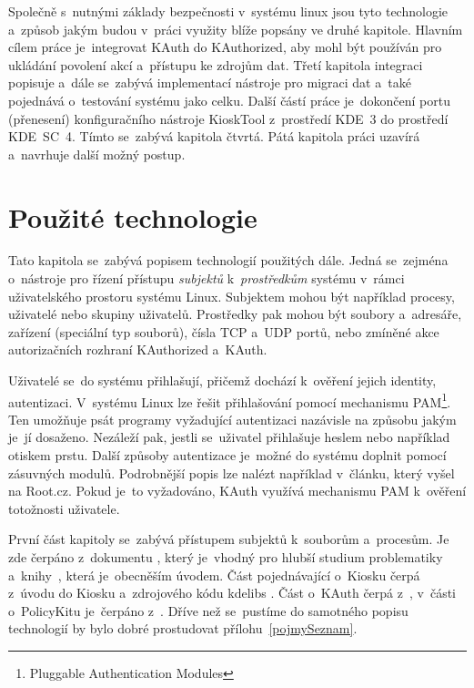 Společně s~nutnými základy bezpečnosti v~systému linux jsou tyto technologie a~způsob jakým budou v~práci využity blíže popsány ve druhé kapitole. Hlavním cílem práce je~integrovat KAuth do KAuthorized, aby mohl být používán pro ukládání povolení akcí a~přístupu ke zdrojům dat. Třetí kapitola integraci popisuje a~dále se~zabývá implementací nástroje pro migraci dat a~také pojednává o~testování systému jako celku. Další částí práce je~dokončení portu (přenesení) konfiguračního nástroje KioskTool z~prostředí KDE~3 do prostředí KDE~SC~4. Tímto se~zabývá kapitola čtvrtá. Pátá kapitola práci uzavírá a~navrhuje další možný postup.

\chapter{Použité technologie}
Tato kapitola se~zabývá popisem technologií použitých dále. Jedná se~zejména o~nástroje pro řízení přístupu \emph{subjektů} k~\emph{prostředkům} systému v~rámci uživatelského prostoru systému Linux. Subjektem mohou být například procesy, uživatelé nebo skupiny uživatelů. Prostředky pak mohou být soubory a~adresáře, zařízení (speciální typ souborů), čísla TCP a~UDP portů, nebo zmíněné akce autorizačních rozhraní KAuthorized a~KAuth.

Uživatelé se~do systému přihlašují, přičemž dochází k~ověření jejich identity, autentizaci. V~systému Linux lze řešit přihlašování pomocí mechanismu PAM\footnote{Pluggable Authentication Modules}. Ten umožňuje psát programy vyžadující autentizaci nazávisle na způsobu jakým je~jí dosaženo. Nezáleží pak, jestli se~uživatel přihlašuje heslem nebo například otiskem prstu. Další způsoby autentizace je~možné do systému doplnit pomocí zásuvných modulů. Podrobnější popis lze nalézt například v~článku, který vyšel na Root.cz\cite{rootpam}. Pokud je~to vyžadováno, KAuth využívá mechanismu PAM k~ověření totožnosti uživatele.

První část kapitoly se~zabývá přístupem subjektů k~souborům a~procesům. Je zde čerpáno z~dokumentu \cite{secureProg}, který je~vhodný pro hlubší studium problematiky a~knihy~\cite{OSP}, která je~obecněším úvodem. Část pojednávající o~Kiosku čerpá z~úvodu do Kiosku \cite{Kioskintro} a~zdrojového kódu kdelibs \cite{codeKdeLibs}. Část o~KAuth čerpá z~\cite{codeKAuth,KAuthusage}, v~části o~PolicyKitu je~čerpáno z~\cite{manpolkit_overview, manpolkit1, manpklocalauth}. Dříve než se~pustíme do samotného popisu technologií by bylo dobré prostudovat přílohu~\ref{pojmySeznam}.


